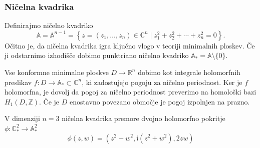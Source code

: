 \documentclass[8pt]{beamer}
\theoremstyle{definition}
\theoremstyle{remark}
\theoremstyle{plain}
\numberwithin{equation}{section}  %
\begin{document}
\begin{frame}
    \frametitle{Ničelna kvadrika}

    Definirajmo \textcolor{red1}{ničelno kvadriko} 
    \begin{equation*}
        \mathbb{A}=\mathbb{A}^{n-1}=\left\{z=\left(z_1, \ldots, z_n\right) \in \mathbb{C}^n \mid z_1^2+z_2^2+\cdots+z_n^2=0\right\}.    
    \end{equation*}
    Očitno je, da ničelna kvadrika igra ključno vlogo v teoriji minimalnih ploskev. Če ji odstarnimo izhodišče dobimo \textcolor{red1}{punktriano ničelno kvadriko} $\mathbb{A}_*=\mathbb{A} \setminus \{0\}$. 
    \pause
    \vspace{0.8em}
    
    Vse konformne minimalne ploskve $D \rightarrow \mathbb{R}^n$ dobimo kot integrale holomorfnih preslikav $f: D \rightarrow \mathbb{A}_* \subset \mathbb{C}^n$, ki zadostujejo pogoju za ničelno periodnost. Ker je $f$ holomorfna, je dovolj da pogoj za ničelno periodnost preverimo na homološki bazi $H_1(D, \mathbb{Z})$. Če je $D$ enostavno povezano območje je pogoj izpolnjen na prazno. 
    \pause
    \vspace{0.8em}

    V dimenziji $n=3$ ničelna kvadrika premore dvojno holomorfno pokritje $\phi: \mathbb{C}_*^2 \rightarrow \mathbb{A}_*^2$
    \begin{equation*}
        \phi(z, w)=\left(z^2-w^2, \mathfrak{i}\left(z^2+w^2\right), 2 z w\right)
    \end{equation*}

\end{frame}
\end{document}
